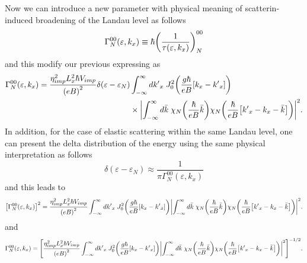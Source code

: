 \noindent
Now we can introduce a new parameter with physical meaning of scatterin-induced broadening of the Landau level as follows
\begin{equation} \label{5.3}
  \Gamma^{00}_{N}(\varepsilon,k_x) \equiv \hbar \qty(\frac{1}{\tau(\varepsilon,k_x)})^{00}_{N}
\end{equation}
and this modify our previous expressing as
\begin{equation} \label{5.4}
  \begin{aligned}
    \Gamma^{00}_{N}(\varepsilon,k_x)  =
    \frac { \eta_{imp}^2 L_x^2 \hbar V_{imp}}{\qty(eB)^2}
    \delta(\varepsilon - \varepsilon_{N}) &
    \int_{-\infty}^{\infty} d {k'}_x \;
    J_0^2\qty(\frac{g\hbar}{eB}[{k}_x - {k'}_x])
    \\
    & \times
    \qty|
    \int_{-\infty}^{\infty} d\bar{k} \;
    {\chi}_{N}\qty(\frac{\hbar}{eB}\bar{k})
    {\chi}_{N}\qty(\frac{\hbar}{eB} \qty[{k'}_x - {k}_x - \bar{k}])|^2.
  \end{aligned}
\end{equation}
In addition, for the case of elastic scattering within the same Landau level, one can present the delta distribution of the energy using the same physical interpretation as follows
\begin{equation} \label{5.5}
  \delta(\varepsilon - \varepsilon_{N}) \approx
  \frac{1}{\pi \Gamma^{00}_{N}(\varepsilon,k_x)}
\end{equation}
and this leads to
\begin{equation} \label{5.6}
  \begin{aligned}
    \qty[\Gamma^{00}_{N}(\varepsilon,k_x)]^2  =
    \frac { \eta_{imp}^2 L_x^2 \hbar V_{imp}}{\qty(eB)^2}
    \int_{-\infty}^{\infty} d {k'}_x \;
    J_0^2\qty(\frac{g\hbar}{eB}[{k}_x - {k'}_x])
    \qty|
    \int_{-\infty}^{\infty} d\bar{k} \;
    {\chi}_{N}\qty(\frac{\hbar}{eB}\bar{k})
    {\chi}_{N}\qty(\frac{\hbar}{eB} \qty[{k'}_x - {k}_x - \bar{k}])|^2.
  \end{aligned}
\end{equation}
and
\begin{equation} \label{5.7}
  \begin{aligned}
    \Gamma^{00}_{N}(\varepsilon,k_x)  =
    \qty[
    \frac { \eta_{imp}^2 L_x^2 \hbar V_{imp}}{\qty(eB)^2}
    \int_{-\infty}^{\infty} d {k'}_x \;
    J_0^2\qty(\frac{g\hbar}{eB}[{k}_x - {k'}_x])
    \qty|
    \int_{-\infty}^{\infty} d\bar{k} \;
    {\chi}_{N}\qty(\frac{\hbar}{eB}\bar{k})
    {\chi}_{N}\qty(\frac{\hbar}{eB} \qty[{k'}_x - {k}_x - \bar{k}])|^2
    ]^{-1/2}.
  \end{aligned}
\end{equation}

